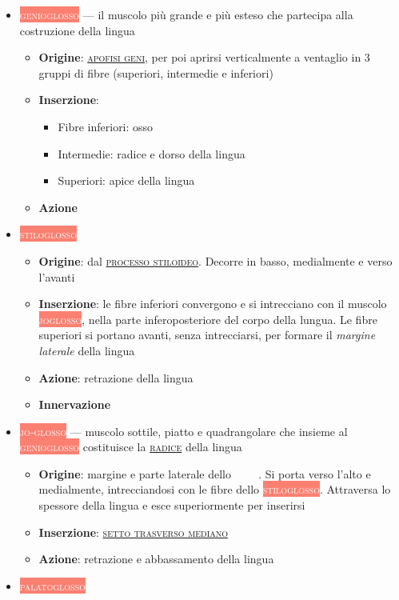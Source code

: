 \documentclass[italian,]{article}
\providecommand{\tightlist}{%
  \setlength{\itemsep}{0pt}\setlength{\parskip}{0pt}}
\newcommand{\mus}[1]{\colorbox{Salmon}{\textcolor{white}{\textsc{#1}}}}
\newcommand{\oss}[1]{\colorbox{ossa}{\textcolor{white}{\textsc{#1}}}}
\renewcommand{\a}[1]{\underline{\textsc{#1}}}
\begin{document}
\begin{itemize}
\tightlist
\item
  \mus{genioglosso} --- il muscolo più grande e più esteso che partecipa
  alla costruzione della lingua

  \begin{itemize}
  \tightlist
  \item
    \textbf{Origine}: \a{apofisi geni}, per poi aprirsi verticalmente a
    ventaglio in 3 gruppi di fibre (superiori, intermedie e inferiori)
  \item
    \textbf{Inserzione}:

    \begin{itemize}
    \tightlist
    \item
      Fibre inferiori: osso \oss{ioide}
    \item
      Intermedie: radice e dorso della lingua
    \item
      Superiori: apice della lingua
    \end{itemize}
  \item
    \textbf{Azione}
  \end{itemize}
\item
  \mus{stiloglosso}~

  \begin{itemize}
  \tightlist
  \item
    \textbf{Origine}: dal \a{processo stiloideo}. Decorre in basso,
    medialmente e verso l'avanti
  \item
    \textbf{Inserzione}: le fibre inferiori convergono e si intrecciano
    con il muscolo \mus{joglosso}, nella parte inferoposteriore del
    corpo della lungua. Le fibre superiori si portano avanti, senza
    intrecciarsi, per formare il \emph{margine laterale} della lingua
  \item
    \textbf{Azione}: retrazione della lingua
  \item
    \textbf{Innervazione}
  \end{itemize}
\item
  \mus{jo-glosso} --- muscolo sottile, piatto e quadrangolare che
  insieme al \mus{genioglosso} costituisce la \a{radice} della lingua

  \begin{itemize}
  \tightlist
  \item
    \textbf{Origine}: margine e parte laterale dello \oss{ioide}. Si
    porta verso l'alto e medialmente, intrecciandosi con le fibre dello
    \mus{stiloglosso}. Attraversa lo spessore della lingua e esce
    superiormente per inserirsi
  \item
    \textbf{Inserzione}: \a{setto trasverso mediano}
  \item
    \textbf{Azione}: retrazione e abbassamento della lingua
  \end{itemize}
\item
  \mus{palatoglosso}~


\end{itemize}
\end{document}
